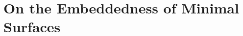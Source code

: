 \documentclass[a4paper, 11pt]{article}
\theoremstyle{plain}
\theoremstyle{definition}
\theoremstyle{remark}
\DeclareMathOperator{\diff}{d \!}
\numberwithin{equation}{subsection}
\def\({}
\def\){}
\begin{document}
\begin{comment}
Since 
\begin{equation}
\int_{0}^{\rho}\vert F_{0}(t)\vert \diff t \leqslant \frac{1}{2}\Lambda\Bigl(\frac{\rho}{R}\Bigr)^{1-\frac{n}{p}}
\end{equation}
and 
\begin{equation}
\vert F(\rho) - F(0)\vert = \biggl| \int_{0}^{\rho}F'(t)\diff t\biggr| \leqslant e^{\frac{1}{2}\Lambda}\int_{0}^{\rho}\vert F_{0}(t) \vert \diff t,
\end{equation}
we then have the following bounds:
\begin{equation}
\begin{cases}
\exp(-\Lambda) \leqslant \exp\Bigl(-\frac{1}{2}\Lambda\bigl(\frac{\rho}{R}\bigr)^{1-\frac{n}{p}}\Bigr) \leqslant F(\rho) \leqslant \exp\Bigl(\frac{1}{2}\Lambda\bigl(\frac{\rho}{R}\bigr)^{1-\frac{n}{p}}\Bigr) \leqslant \exp(\Lambda), \\
\\
\vert E(\rho)\vert \leqslant \frac{1}{2}\exp\Bigl(\frac{1}{2}\Lambda\bigl(\frac{\rho}{R}\bigr)^{1-\frac{n}{p}}\Bigr),
\end{cases}
\end{equation}
where \(0 < \rho \leqslant R\). In particular, if \(\Lambda \leqslant 1\) we have that
\begin{equation}
\vert E(\rho) \vert \leqslant \Lambda\Bigl(\frac{\rho}{R}\Bigr)^{1-\frac{n}{p}},
\end{equation}
so we may proceed exactly as before, integrating from \(\rho\) to \(\sigma\) and letting \(\varepsilon \downarrow 0\) to obtain:
\begin{equation}
\bigl[\bigl(F(\tau)\tau^{-n}\mu_{V}(B_{\rho}(x_{0})) + E(\tau)\bigr)\bigr]_{\tau = \sigma}^{\tau = \rho} = G(\rho,\sigma) \int_{B_{\rho}(x_{0}) \setminus B_{\sigma}(x_{0})} \frac{\vert D^{\perp}r \vert^{2}}{r^{n}} \diff\mu_{V},
\end{equation}
where \(G(\rho, \sigma) \in \bigl[e^{-\Lambda}, e^{\Lambda}\bigr]\) and \(0 < \sigma \leqslant \rho \leqslant R\), so the above bounds hold. In particular, the function
\begin{equation}
\rho \longmapsto\!F(\rho)\rho^{-n}\mu_{V}(B_{\rho}(x_0)) + E(\rho)
\end{equation}
is increasing on the interval \((0, R]\). Arguing as above, we can conclude that the density \(\Theta^{n}(\mu_{V}, x_{0})\) exists for all \(x_{0} \in U\), and is an upper semicontinuous function on \(U\).
\end{comment}

\section{On the Embeddedness of Minimal Surfaces}
\label{Paper}
\end{document}
